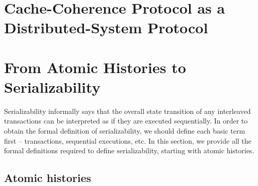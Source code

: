 \section{Cache-Coherence Protocol as a Distributed-System Protocol}



\section{From Atomic Histories to Serializability}

Serializability informally says that the overall state transition of any interleaved transactions can be interpreted as if they are executed sequentially.
In order to obtain the formal definition of serializability, we should define each basic term first -- transactions, sequential executions, etc.
In this section, we provide all the formal definitions required to define serializability, starting with atomic histories.

\subsection{Atomic histories}

